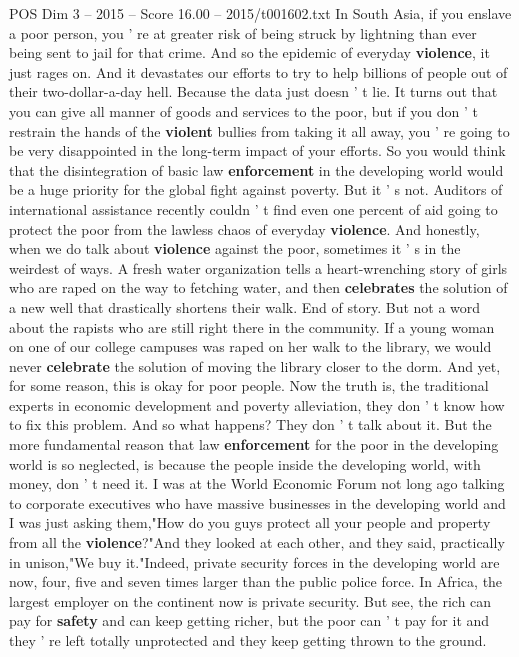 \begin{textsample}{POS Dim 3 – 2015 – Score 16.00 – 2015/t001602.txt}
In South Asia, if you enslave a poor person, you ' re at greater risk of being struck by lightning than ever being sent to jail for that crime.
And so the epidemic of everyday \textbf{violence}, it just rages on.
And it devastates our efforts to try to help billions of people out of their two-dollar-a-day hell.
Because the data just doesn ' t lie.
It turns out that you can give all manner of goods and services to the poor, but if you don ' t restrain the hands of the \textbf{violent} bullies from taking it all away, you ' re going to be very disappointed in the long-term impact of your efforts.
So you would think that the disintegration of basic law \textbf{enforcement} in the developing world would be a huge priority for the global fight against poverty.
But it ' s not.
Auditors of international assistance recently couldn ' t find even one percent of aid going to protect the poor from the lawless chaos of everyday \textbf{violence}.
And honestly, when we do talk about \textbf{violence} against the poor, sometimes it ' s in the weirdest of ways.
A fresh water organization tells a heart-wrenching story of girls who are raped on the way to fetching water, and then \textbf{celebrates} the solution of a new well that drastically shortens their walk.
End of story.
But not a word about the rapists who are still right there in the community.
If a young woman on one of our college campuses was raped on her walk to the library, we would never \textbf{celebrate} the solution of moving the library closer to the dorm.
And yet, for some reason, this is okay for poor people.
Now the truth is, the traditional experts in economic development and poverty alleviation, they don ' t know how to fix this problem.
And so what happens?
They don ' t talk about it.
But the more fundamental reason that law \textbf{enforcement} for the poor in the developing world is so neglected, is because the people inside the developing world, with money, don ' t need it.
I was at the World Economic Forum not long ago talking to corporate executives who have massive businesses in the developing world and I was just asking them,"How do you guys protect all your people and property from all the \textbf{violence}?"And they looked at each other, and they said, practically in unison,"We buy it."Indeed, private security forces in the developing world are now, four, five and seven times larger than the public police force.
In Africa, the largest employer on the continent now is private security.
But see, the rich can pay for \textbf{safety} and can keep getting richer, but the poor can ' t pay for it and they ' re left totally unprotected and they keep getting thrown to the ground.

\end{textsample}
